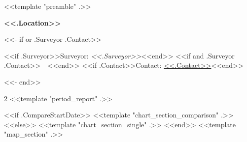 <<template "preamble" .>>



\vspace{-8pt}
\begin{center}
{\huge\bfseries <<.Location>>\par}
\vspace{0.1cm}
<<- if or .Surveyor .Contact>>
{\large
<<if .Surveyor>>Surveyor: \textit{<<.Surveyor>>}<<end>>
<<if and .Surveyor .Contact>>\ \textbullet\ <<end>>
<<if .Contact>>Contact: \href{mailto:<<.Contact>>}{<<.Contact>>}<<end>>
\par}
<<- end>>
\end{center}

\begin{multicols}{2}
<<template "period_report" .>>
\end{multicols}

<<if .CompareStartDate>>
<<template "chart_section_comparison" .>>
<<else>>
<<template "chart_section_single" .>>
<<end>>
<<template "map_section" .>>


